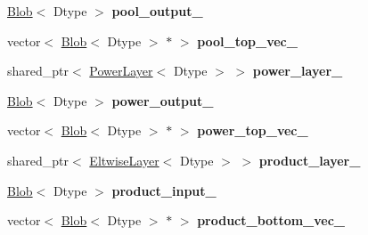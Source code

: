 \begin{DoxyCompactItemize}
\item 
\hyperlink{classcaffe_1_1Blob}{Blob}$<$ Dtype $>$ {\bfseries pool\+\_\+output\+\_\+}\hypertarget{classcaffe_1_1LRNLayer_a7dfcd31ed9694bdd48c9e80bdfe1e7a4}{}\label{classcaffe_1_1LRNLayer_a7dfcd31ed9694bdd48c9e80bdfe1e7a4}

\item 
vector$<$ \hyperlink{classcaffe_1_1Blob}{Blob}$<$ Dtype $>$ $\ast$ $>$ {\bfseries pool\+\_\+top\+\_\+vec\+\_\+}\hypertarget{classcaffe_1_1LRNLayer_af1d75143e7d103749575c3ee167e1c8d}{}\label{classcaffe_1_1LRNLayer_af1d75143e7d103749575c3ee167e1c8d}

\item 
shared\+\_\+ptr$<$ \hyperlink{classcaffe_1_1PowerLayer}{Power\+Layer}$<$ Dtype $>$ $>$ {\bfseries power\+\_\+layer\+\_\+}\hypertarget{classcaffe_1_1LRNLayer_a7d9446e995a4e4d1c27961159c1e7950}{}\label{classcaffe_1_1LRNLayer_a7d9446e995a4e4d1c27961159c1e7950}

\item 
\hyperlink{classcaffe_1_1Blob}{Blob}$<$ Dtype $>$ {\bfseries power\+\_\+output\+\_\+}\hypertarget{classcaffe_1_1LRNLayer_adb51a5bb10b26a27835b2b19ecfe72b2}{}\label{classcaffe_1_1LRNLayer_adb51a5bb10b26a27835b2b19ecfe72b2}

\item 
vector$<$ \hyperlink{classcaffe_1_1Blob}{Blob}$<$ Dtype $>$ $\ast$ $>$ {\bfseries power\+\_\+top\+\_\+vec\+\_\+}\hypertarget{classcaffe_1_1LRNLayer_ac83227b50de568833235e7b2bdfbb8a8}{}\label{classcaffe_1_1LRNLayer_ac83227b50de568833235e7b2bdfbb8a8}

\item 
shared\+\_\+ptr$<$ \hyperlink{classcaffe_1_1EltwiseLayer}{Eltwise\+Layer}$<$ Dtype $>$ $>$ {\bfseries product\+\_\+layer\+\_\+}\hypertarget{classcaffe_1_1LRNLayer_a83ee2091c7f93f72cec177d98124b16f}{}\label{classcaffe_1_1LRNLayer_a83ee2091c7f93f72cec177d98124b16f}

\item 
\hyperlink{classcaffe_1_1Blob}{Blob}$<$ Dtype $>$ {\bfseries product\+\_\+input\+\_\+}\hypertarget{classcaffe_1_1LRNLayer_aff284ba9f23d00aefa62759ee50b7253}{}\label{classcaffe_1_1LRNLayer_aff284ba9f23d00aefa62759ee50b7253}

\item 
vector$<$ \hyperlink{classcaffe_1_1Blob}{Blob}$<$ Dtype $>$ $\ast$ $>$ {\bfseries product\+\_\+bottom\+\_\+vec\+\_\+}\hypertarget{classcaffe_1_1LRNLayer_ab1bf581b7cf42b36bdbad8333989a177}{}\label{classcaffe_1_1LRNLayer_ab1bf581b7cf42b36bdbad8333989a177}

\end{DoxyCompactItemize}


